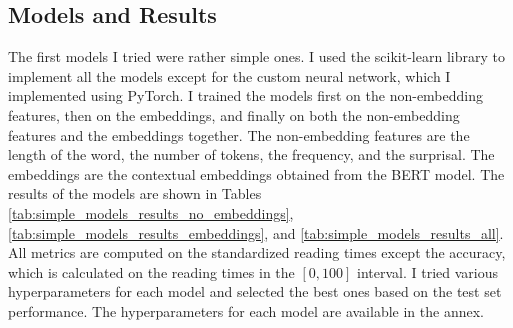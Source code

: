 \subsection{Models and Results}
The first models I tried were rather simple ones. I used the scikit-learn library to implement all the models except for the custom neural network, which I implemented using PyTorch.
I trained the models first on the non-embedding features, then on the embeddings, and finally on both the non-embedding features and the embeddings together. The non-embedding features are the length of the word, the number of tokens, the frequency, and the surprisal. The embeddings are the contextual embeddings obtained from the BERT model. The results of the models are shown in Tables \ref{tab:simple_models_results_no_embeddings}, \ref{tab:simple_models_results_embeddings}, and \ref{tab:simple_models_results_all}. All metrics are computed on the standardized reading times except the accuracy, which is calculated on the reading times in the \([0, 100]\) interval. I tried various hyperparameters for each model and selected the best ones based on the test set performance. The hyperparameters for each model are available in the annex.

